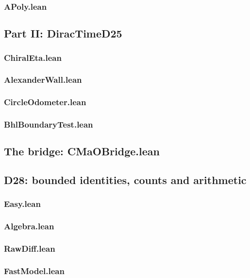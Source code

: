 \documentclass[11pt]{article}
\theoremstyle{definition}
\begin{document}
\subsubsection*{APoly.lean}
\subsection*{Part II: DiracTimeD25}
\subsubsection*{ChiralEta.lean}
\subsubsection*{AlexanderWall.lean}
\subsubsection*{CircleOdometer.lean}
\subsubsection*{BhlBoundaryTest.lean}
\subsection*{The bridge: CMaOBridge.lean}
\subsection*{D28: bounded identities, counts and arithmetic}
\subsubsection*{Easy.lean}
\subsubsection*{Algebra.lean}
\subsubsection*{RawDiff.lean}
\subsubsection*{FastModel.lean}
\end{document}
